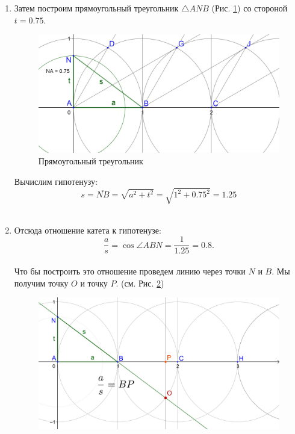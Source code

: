 \documentclass[12pt, letterpaper, oneside]{report}
\begin{document}
\begin{enumerate}
	\item Затем построим прямоугольный треугольник $\triangle ANB$ (Рис. \ref{fig:1_anb}) со стороной $t=0.75$. \\
\begin{figure}[H]
	\centerline{\includegraphics[scale=0.18]{img/1_anb.jpg}}
	\caption{Прямоугольный треугольник}
	\label{fig:1_anb}
\end{figure}	
	Вычислим гипотенузу:
\begin{equation}
s=\overline{NB}=\sqrt{a^{2}+t^{2}}=\sqrt{1^{2}+0.75^{2}}=1.25
\end{equation}
\\
	\item Отсюда отношение катета к гипотенузе:
\begin{equation}
	\dfrac{a}{s}=\cos \angle ABN=\dfrac{1}{1.25}=0.8.
\end{equation}
\\
Что бы построить это отношение проведем линию через точки $N$ и $B$. Мы получим точку $O$ и точку $P$. (см. Рис. \ref{fig:2_second})
\begin{figure}[h]
	\centerline{\includegraphics[scale=0.2]{img/anbo.jpg}}
	\caption{}
	\label{fig:2_second}
\end{figure}

\end{enumerate}
\end{document}
